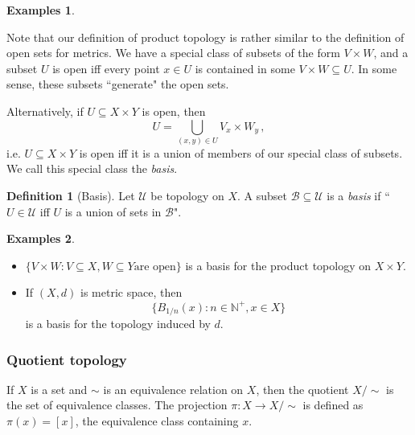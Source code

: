 \documentclass[a4paper,11pt]{article}
\theoremstyle{definition}
\newtheorem*{defn}{Definition}
\newtheorem*{exs}{Examples}
\numberwithin{equation}{section}
\begin{document}
\begin{exs}
\begin{itemize}
\begin{figure}[h]
\begin{minipage}{.47\textwidth}
        \end{minipage}
    \end{figure}
\end{itemize}
\end{exs}

Note that our definition of product topology is rather similar to the definition of open sets for metrics. We have a special class of subsets of the form $V\times W$, and a subset $U$ is open iff every point $x\in U$ is contained in some $V\times W\subseteq U$. In some sense, these subsets ``generate" the open sets.

Alternatively, if $U\subseteq X\times Y$ is open, then
\[
U=\bigcup_{(x,y)\in U}V_x\times W_y\,,
\]
i.e. $U\subseteq X\times Y$ is open iff it is a union of members of our special class of subsets. We call this special class the \emph{basis}.

\begin{defn}[Basis]
    Let $\mathcal{U}$ be topology on $X$. A subset $\mathcal{B}\subseteq\mathcal{U}$ is a \emph{basis} if ``$U\in \mathcal{U}$ iff $U$ is a union of sets in $\mathcal{B}$".
\end{defn}

\begin{exs}
\leavevmode
\begin{itemize}
    \item $\{V\times W:V\subseteq X,W\subseteq Y \text{are open}\}$ is a basis for the product topology on $X\times Y$.
    \item If $(X,d)$ is metric space, then
    \[
    \{B_{1/n}(x):n\in\mathbb{N}^+,x\in X\}
    \]
    is a basis for the topology induced by $d$.
\end{itemize}
\end{exs}

\subsubsection{Quotient topology}
If $X$ is a set and $\sim$ is an equivalence relation on $X$, then the quotient $X/\sim$ is the set of equivalence classes. The projection $\pi:X\rightarrow X/\sim$ is defined as $\pi(x)=[x]$, the equivalence class containing $x$.
\end{document}
